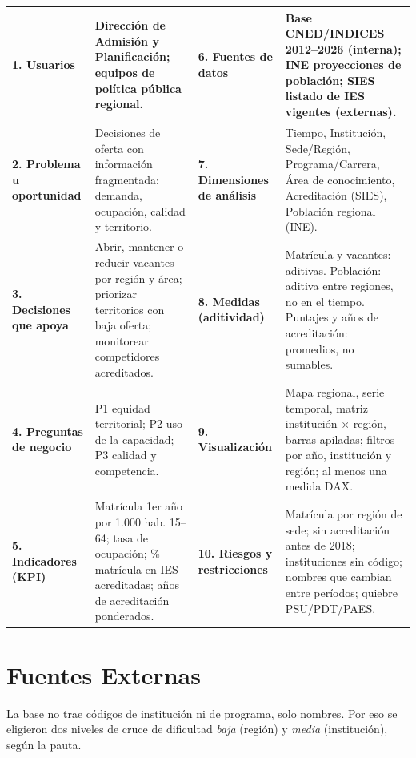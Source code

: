 \documentclass[11pt,a4paper]{article}
\begin{document}
\begin{center}
\small
\begin{tabularx}{\textwidth}{|>{}p{2.7cm}|Y|>{}p{2.7cm}|Y|}
\hline
\textbf{\color{primaryblue}1. Usuarios} & Direcci\'on de Admisi\'on y Planificaci\'on; equipos de pol\'itica p\'ublica regional. &
\textbf{\color{primaryblue}6. Fuentes de datos} & Base CNED/INDICES 2012--2026 (interna); INE proyecciones de poblaci\'on; SIES listado de IES vigentes (externas). \\
\hline
\textbf{\color{primaryblue}2. Problema u oportunidad} & Decisiones de oferta con informaci\'on fragmentada: demanda, ocupaci\'on, calidad y territorio. &
\textbf{\color{primaryblue}7. Dimensiones de an\'alisis} & Tiempo, Instituci\'on, Sede/Regi\'on, Programa/Carrera, \'Area de conocimiento, Acreditaci\'on (SIES), Poblaci\'on regional (INE). \\
\hline
\textbf{\color{primaryblue}3. Decisiones que apoya} & Abrir, mantener o reducir vacantes por regi\'on y \'area; priorizar territorios con baja oferta; monitorear competidores acreditados. &
\textbf{\color{primaryblue}8. Medidas (aditividad)} & Matr\'icula y vacantes: aditivas. Poblaci\'on: aditiva entre regiones, no en el tiempo. Puntajes y a\~nos de acreditaci\'on: promedios, no sumables. \\
\hline
\textbf{\color{primaryblue}4. Preguntas de negocio} & P1 equidad territorial; P2 uso de la capacidad; P3 calidad y competencia. &
\textbf{\color{primaryblue}9. Visualizaci\'on} & Mapa regional, serie temporal, matriz instituci\'on $\times$ regi\'on, barras apiladas; filtros por a\~no, instituci\'on y regi\'on; al menos una medida DAX. \\
\hline
\textbf{\color{primaryblue}5. Indicadores (KPI)} & Matr\'icula 1er a\~no por 1.000 hab. 15--64; tasa de ocupaci\'on; \% matr\'icula en IES acreditadas; a\~nos de acreditaci\'on ponderados. &
\textbf{\color{primaryblue}10. Riesgos y restricciones} & Matr\'icula por regi\'on de sede; sin acreditaci\'on antes de 2018; instituciones sin c\'odigo; nombres que cambian entre per\'iodos; quiebre PSU/PDT/PAES. \\
\hline
\end{tabularx}
\end{center}

\section{Fuentes Externas}
La base no trae c\'odigos de instituci\'on ni de programa, solo nombres. Por eso se eligieron dos niveles de cruce de dificultad \emph{baja} (regi\'on) y \emph{media} (instituci\'on), seg\'un la pauta.
\end{document}
